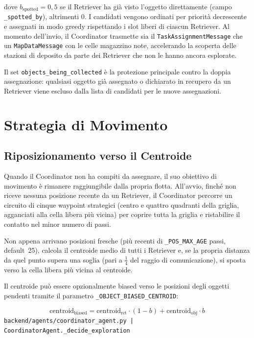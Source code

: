 dove $b_{\text{spotted}} = 0{,}5$ se il Retriever ha gi\`a visto l'oggetto direttamente
(campo \texttt{\_spotted\_by}), altrimenti $0$. I candidati vengono ordinati per priorit\`a
decrescente e assegnati in modo greedy rispettando i slot liberi di ciascun Retriever.
Al momento dell'invio, il Coordinator trasmette sia il \texttt{TaskAssignmentMessage}
che un \texttt{MapDataMessage} con le celle magazzino note, accelerando la scoperta delle
stazioni di deposito da parte dei Retriever che non le hanno ancora esplorate.

Il set \texttt{objects\_being\_collected} \`e la protezione principale contro la doppia
assegnazione: qualsiasi oggetto gi\`a assegnato o dichiarato in recupero da un Retriever
viene escluso dalla lista di candidati per le nuove assegnazioni.

\section{Strategia di Movimento}

\subsection{Riposizionamento verso il Centroide}

Quando il Coordinator non ha compiti da assegnare, il suo obiettivo di movimento \`e
rimanere raggiungibile dalla propria flotta. All'avvio, finch\'e non riceve nessuna
posizione recente da un Retriever, il Coordinator percorre un circuito di cinque waypoint
strategici (centro e quattro quadranti della griglia, agganciati alla cella libera pi\`u
vicina) per coprire tutta la griglia e ristabilire il contatto nel minor numero di passi.

Non appena arrivano posizioni fresche (pi\`u recenti di \texttt{\_POS\_MAX\_AGE} passi,
default~25), calcola il centroide medio di tutti i Retriever e, se la propria distanza
da quel punto supera una soglia (pari a $\frac{1}{4}$ del raggio di comunicazione),
si sposta verso la cella libera pi\`u vicina al centroide.

Il centroide pu\`o essere opzionalmente biased verso le posizioni degli oggetti
pendenti tramite il parametro \texttt{\_OBJECT\_BIASED\_CENTROID}:

$$\text{centroid}_{\text{biased}} = \text{centroid}_{\text{ret}} \cdot (1 - b) + \text{centroid}_{\text{obj}} \cdot b$$
\noindent\hfill{\footnotesize\texttt{backend/agents/coordinator\_agent.py | CoordinatorAgent.\_decide\_exploration}}

